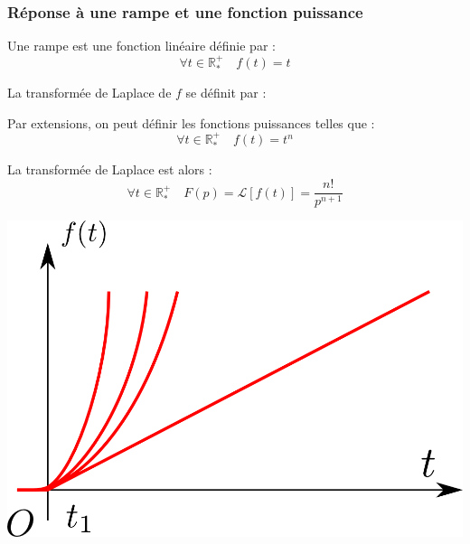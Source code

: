 \documentclass[11pt,oneside]{article}
\begin{document}
\subsubsection*{Réponse à une rampe et une fonction puissance}
\begin{minipage}[c]{.6\linewidth}
\begin{defi}
Une rampe est une fonction linéaire définie par : 
$$ \forall t \in \mathbb{R}^+_* \quad f(t) = t$$

La transformée de Laplace de $f$ se définit par : 

\end{defi}
\begin{defi}
Par extensions, on peut définir les fonctions puissances telles que :
$$ \forall t \in \mathbb{R}^+_* \quad f(t) = t^n$$

La transformée de Laplace est alors :
$$ \forall t\in \mathbb{R}^+_*  \quad
F(p) = \mathcal{L} \left[f(t)\right]  =
\dfrac{n!}{p^{n+1}} $$
\end{defi}
\end{minipage} \hfill
\begin{minipage}[c]{.35\linewidth}
\begin{center}
\includegraphics[width=.9\textwidth]{png/rampe}
\end{center}
\end{minipage}
\end{document}

